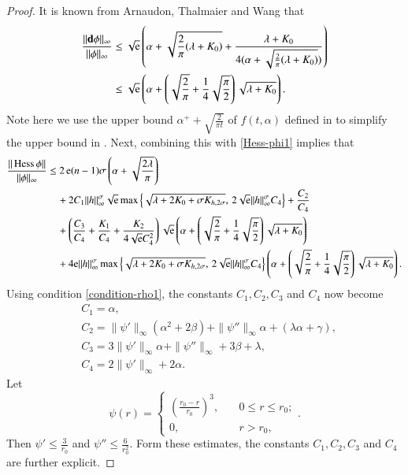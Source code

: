 \documentclass[11pt,reqno]{amsart}
\theoremstyle{definition} \newtheorem{remark}[theorem]{Remark}
\numberwithin{equation}{section}
\newcommand\1{\mathbbm{1}}
\def\bd{{\bf d}}
\def\r{\right}
\def\l{\left} \def\e{\operatorname{e}} \def\dsum{\displaystyle\sum}
\begin{document}
\begin{proof}
It is known from  Arnaudon, Thalmaier and Wang \cite[Eq. (2.8)]{ATW} that
\begin{align*}
\frac{\|\bd \phi\|_{\infty}}{\|\phi\|_{\infty}}&\leq 
\sqrt{\e}\l(\alpha+\sqrt{\frac{2}{\pi}(\lambda+K_0)}+\frac{\lambda+K_0}{4(\alpha+\sqrt{\frac{2}{\pi}(\lambda+K_0)} )}\r)\\
&\leq 
\sqrt{\e}\l(\alpha+\l(\sqrt{\frac{2}{\pi}}+ \frac{1}{4}\sqrt{\frac{\pi}{2}}\r)\sqrt{\lambda+K_0}\r).
\end{align*}
Note here we use the upper bound $\alpha^++\sqrt{\frac{2}{\pi t}}$ of  $f(t,\alpha)$ defined in \cite{ATW} to simplify the upper bound in \cite[Eq. (2.8)]{ATW}.  Next, 
combining this with \eqref{Hess-phi1} implies that
\begin{align}\label{add-Hess-D3}
\frac{\|\Hess \phi\|}{\|\phi\|_{\infty}}
&\leq  2\e (n-1)\sigma\l(\alpha+\sqrt{\frac{2\lambda}{\pi}}\r)\notag\\
&\quad+2C_1\|h\|_{\infty}^{\sigma}\sqrt{\e} \max \l\{\sqrt{\lambda+2K_0+\sigma K_{h,2\sigma}},\, 2\sqrt{\e}\|h\|_{\infty}^{\sigma}C_4\r\}  + \frac{C_2}{C_4}\notag\\
&\quad+\l(\frac{C_3}{C_4} +\frac{K_1}{C_4} +\frac{K_2}{4\sqrt{\e}C_4^2}\r) \sqrt{\e}\l(\alpha+\l(\sqrt{\frac{2}{\pi}}+ \frac{1}{4}\sqrt{\frac{\pi}{2}}\r)\sqrt{\lambda+K_0}\r) \notag\\
&\quad + 4{\e}\|h\|_{\infty}^{\sigma} \max \l\{\sqrt{\lambda+2K_0+\sigma K_{h,2\sigma}},\, 2\sqrt{\e}\|h\|_{\infty}^{\sigma}C_4\r\}\l(\alpha+\l(\sqrt{\frac{2}{\pi}}+ \frac{1}{4}\sqrt{\frac{\pi}{2}}\r)\sqrt{\lambda+K_0}\r).
\end{align}
Using condition \ref{condition-rho1},  the constants 
 $C_1, C_2, C_3$ and $C_4$ now become
\begin{align*}
&C_1= \alpha, \\
& C_2 = \|\psi'\|_{\infty}(\alpha^2+2\beta)+ \|\psi''\|_{\infty}\alpha +(\lambda \alpha+\gamma),\\
&C_3=3\|\psi'\|_{\infty} \alpha + \|\psi''\|_{\infty}  +3\beta+\lambda,\\
&C_4= 2\|\psi'\|_{\infty}+2\alpha.
 \end{align*}
 Let
\begin{equation}\label{def-psi}
\psi(r)=\begin{cases}
\l(\frac{r_0-r}{r_0}\r)^3,\quad & 0\leq r\leq r_0;  \\
0,\quad &  r>r_0,
\end{cases}.
\end{equation} 
Then $\psi'\leq \frac{3}{r_0}$ and $\psi'' \leq \frac{6}{r_0^2}$. Form these estimates, the 
constants $C_1, C_2,C_3$ and  $C_4$ are further explicit.
\end{proof}
\end{document}
